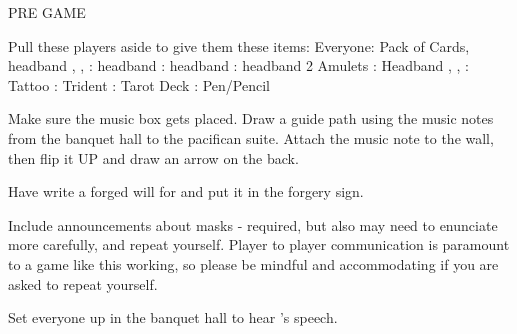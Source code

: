 \documentclass[green]{NeptuneBall}
\begin{document}
\name{\gChecklist{}}

{\large PRE GAME}

Pull these players aside to give them these items:
Everyone: Pack of Cards,  headband
\cAriel{}, \cWillow{}, \cGeneral{}:  headband
\cPrince{}:  headband
\cWitch{}:  headband
			2	Amulets
\cQueen{}:  Headband
\cQueen{}, \cDiplomat{}, \cSpy{}: Tattoo
\cKing{}: Trident
\cSlave{}: Tarot Deck
\cGeneral{}: Pen/Pencil

Make sure the music box gets placed. Draw a guide path using the music notes from the banquet hall to the pacifican suite. Attach the music note to the wall, then flip it UP and draw an arrow on the back.

Have \cPlant{} write a forged will for \cPriest{} and put it in the forgery sign.

Include announcements about masks - required, but also may need to enunciate more carefully, and repeat yourself. Player to player communication is paramount to a game like this working, so please be mindful and accommodating if you are asked to repeat yourself.

Set everyone up in the banquet hall to hear \cManta{}'s speech.
\end{document}
